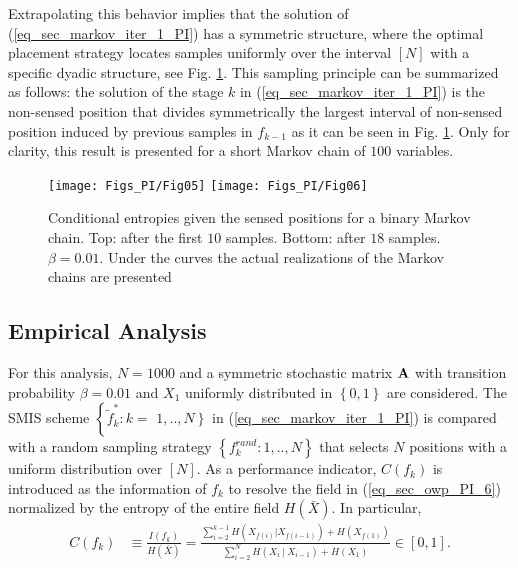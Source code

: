 Extrapolating this behavior implies that the solution of (\ref{eq_sec_markov_iter_1_PI}) has a symmetric structure, where the optimal placement strategy locates samples uniformly over the interval $[N]$ with a specific dyadic structure, see Fig. \ref{fig:re_iterMarkov_dyadic_1_PI}.
This sampling principle can be summarized as follows: the solution of the stage $k$ in (\ref{eq_sec_markov_iter_1_PI}) is the non-sensed position that divides symmetrically the largest interval of non-sensed position induced by previous samples in ${f}_{k-1}$ as it can be seen in Fig. \ref{fig:re_iterMarkov_dyadic_1_PI}. {Only for clarity, this result is presented for a short Markov chain of $100$ variables.}
\begin{figure}[!ht]
    \centering
    \texttt{[image: Figs\_PI/Fig05]}
    \texttt{[image: Figs\_PI/Fig06]}
	\caption[Conditional entropies for a binary Markov chain.]{\label{fig:re_iterMarkov_dyadic_1_PI} Conditional entropies given the sensed positions for a binary Markov chain. Top: after the first $10$ samples. Bottom: after $18$ samples. $\beta = 0.01$. {Under the curves the actual realizations of the Markov chains are presented}}
\end{figure}
\subsection{Empirical Analysis}
For this analysis, $N=1000$ and a symmetric stochastic matrix $\bf{A}$ with transition probability $\beta = 0.01$ and $X_1$ uniformly distributed in $\left\{0,1 \right\}$ are considered. The SMIS scheme $\left\{\right. \tilde{f}^*_k: k=  $ $\left. 1,..,N \right\}$ in (\ref{eq_sec_markov_iter_1_PI}) is compared with a random sampling strategy $\left\{\right. f^{rand}_k: 1,..,N\left.\right\}$ that selects $N$ positions with a uniform distribution over $[N]$. As a performance indicator, $C(f_k)$ is introduced as the information of $f_k$ to resolve the field in (\ref{eq_sec_owp_PI_6}) normalized by the entropy of the entire field $H(\bar{X})$. In particular,
\begin{align}\label{eq_sec_markov_iter_3_PI}
C(f_k) &\equiv \frac{I(f_k)}{H(\bar{X})} = \frac{\sum_{i=2}^{k-1}{H(X_{f(i)} | X_{f(i-1)})} + H(X_{f(1)})}{\sum_{i=2}^{N}{H(X_{i} \ | \ X_{i-1} )}  + H(X_1)}\in [0,1].  
\end{align}

